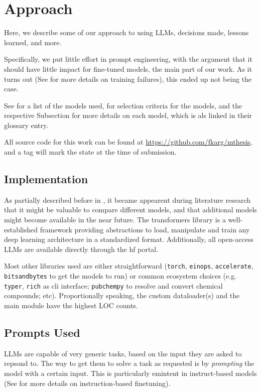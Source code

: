 \chapter{Approach}\label{chap:approach}
Here, we describe some of our approach to using \glspl{LLM}, decisions made, lessons learned, and more.

Specifically, we put little effort in prompt engineering, with the argument that it should have little impact for fine-tuned models, the main part of our work. As it turns out (See  for more details on training failures), this ended up not being the case.

See  for a list of the models used,  for selection criteria for the models, and the respective Subsection for more details on each model, which is als linked in their glossary entry.

All source code for this work can be found at \url{https://github.com/fkarg/mthesis}, and a tag will mark the state at the time of submission.

\section{Implementation}\label{sec:impl}
As partially described before in , it became appearent during literature research that it might be valuable to compare different models, and that additional models might become available in the near future.
The \acrlong{transformers} library is a well-established framework providing abstractions to load, manipulate and train any deep learning architecture in a standardized format.
Additionally, all open-access \glspl{LLM} are available directly through the \gls{hf} portal.

Most other libraries used are either straightforward (\texttt{torch}, \texttt{einops}, \texttt{accelerate}, \texttt{bitsandbytes} to get the models to run) or common ecosystem choices (e.g. \texttt{typer}, \texttt{rich} as cli interface; \texttt{pubchempy} to resolve and convert chemical compounds; etc).
Proportionally speaking, the custom dataloader(s) and the main module have the highest \gls{LOC} counts.



\section{Prompts Used}\label{sec:prompts}
\glspl{LLM} are capable of very generic tasks, based on the input they are asked to repsond to.
The way to get them to solve a task as requested is by \textit{prompting} the model with a certain input.
This is particularly emintent in instruct-based models (See  for more details on instruction-based finetuning).


